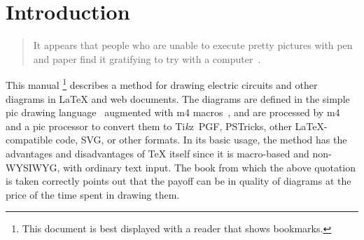 \newcommand{\bq}{}
\newcommand{\dpic}{{\bq dpic}\xspace}
\newcommand{\Dpic}{{\bq Dpic}\xspace}
\newcommand{\dvips}{{\bq dvips}\xspace}
\newcommand{\gpic}{{\bq gpic}\xspace}
\newcommand{\Gpic}{{\bq Gpic}\xspace}
\newcommand{\groff}{{\bq groff}\xspace}
\newcommand{\latex}{\LaTeX\xspace}
\newcommand{\linespec}{{\sl linespec}\xspace}
\newcommand{\MetaPost}{{\bq MetaPost}\xspace}
\newcommand{\Mfour}{{\bq m4}\xspace}
\newcommand{\mfpic}{{\bq mfpic}\xspace}
\newcommand{\PDF}{{\bq PDF}\xspace}
\newcommand{\pic}{{\bq pic}\xspace}
\newcommand{\Pic}{{\bq Pic}\xspace}
\newcommand{\Postscript}{{\bq Postscript}\xspace}
\newcommand{\PSTricks}{{\bq PSTricks}\xspace}
\newcommand{\SVG}{{\bq SVG}\xspace}
\newcommand{\tex}{\TeX\xspace}
\newcommand{\Textregistered}{\textregistered\xspace}
\newcommand{\TPGF}{{\bq Ti{\it k}z~PGF}\xspace}
\newcommand{\Tikz}{{\bq Ti{\it k}z}\xspace}
\newcommand{\tpic}{{\bq tpic}\xspace}
\newcommand{\xfig}{{\bq xfig}\xspace}
\newcommand{\Xfig}{{\bq Xfig}\xspace}
%
\newcommand{\xection}[1]{\section[\texorpdfstring{#1\ \dotfill}{#1}]{#1}}
\newcommand{\NVL}{\\\hspace*{\parindent}}
\newcommand{\brtt}{\hfill\break\hspace*\parindent}
\newcommand{\lbr}{{\tt\char123}}
\newcommand{\rbr}{{\tt\char125}}
\newcommand{\bsl}{{\tt\char92}}
\newcommand{\SR}[1]{\hyperref[#1]{Section~\ref*{#1}}}
\newcommand{\PR}[1]{\hyperref[#1]{page~\pageref*{#1}}}
\newcommand{\FR}[1]{\hyperref[#1]{Figure~\ref*{#1}}}
\newcommand{\FRS}[1]{\hyperref[#1]{Figures~\ref*{#1}}}
\newcommand{\MR}[2]{\hyperref[#1]{#2}}
\newcommand{\REF}[1]{\hyperref[#1]{\ref*{#1}}}
\newcommand{\LQ}{\char96}
\newcommand{\RQ}{\char39}
%
\newcommand{\Example}[1]{\vspace{\parsep}\noindent {\bf Example #1:}}
%
%
\xection{Introduction\label{Introduction:}}
   \begin{quotation}\noindent
   It appears that people
   who are unable to execute pretty pictures with pen and paper find it
   gratifying to try with a computer~\cite{Landauer95}.
   \end{quotation}

This manual%
\footnote{This document is best displayed with a reader that shows bookmarks.}
describes a method for drawing electric circuits and
other diagrams in \latex and web documents.
The diagrams are defined in the simple \pic drawing language~\cite{KRpic}
augmented with \Mfour macros~\cite{KRm4,GnuM4}, and are
processed by \Mfour and a \pic processor to
convert them to \TPGF, \PSTricks, other \latex-compatible code, \SVG,
or other formats.
In its basic usage, the method has the advantages and disadvantages of
\tex itself since it is macro-based and non-WYSIWYG,
with ordinary text input.  The book from which the above quotation
is taken correctly points out that the payoff can be in quality of
diagrams at the price of the time spent in drawing them.

